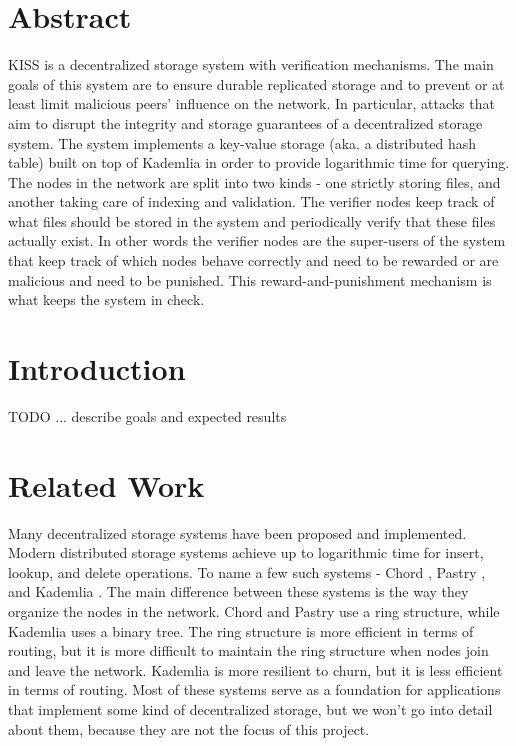 \documentclass[ twoside,openright,titlepage,numbers=noenddot,headinclude,%
                footinclude=true,cleardoublepage=empty,abstractoff, %
                BCOR=5mm,paper=a4,fontsize=11pt,%
                ngerman,american,%
                ]{scrreprt}
\begin{document}
\raggedbottom
{} %
\pagestyle{plain}

\begingroup

\chapter*{Abstract}
KISS is a decentralized storage system with verification mechanisms.
The main goals of this system are to ensure durable replicated storage and to prevent or at least limit malicious peers' influence on the network.
In particular, attacks that aim to disrupt the integrity and storage guarantees of a decentralized storage system.
The system implements a key-value storage (aka. a distributed hash table) built on top of Kademlia in order
to provide logarithmic time for querying.
The nodes in the network are split into two kinds - one strictly storing files, and another taking care of indexing and validation.
The verifier nodes keep track of what files should be stored in the system and periodically verify that these files actually exist.
In other words the verifier nodes are the super-users of the system that keep track of which nodes behave correctly
and need to be rewarded or are malicious and need to be punished.
This reward-and-punishment mechanism is what keeps the system in check.
\vfill
\endgroup			

\chapter{Introduction}

TODO ... describe goals and expected results 

\chapter{Related Work}

Many decentralized storage systems have been proposed and implemented.
Modern distributed storage systems achieve up to logarithmic time for insert, lookup, and delete operations.
To name a few such systems - Chord \cite{chord}, Pastry \cite{pastry}, and Kademlia \cite{kademlia}.
The main difference between these systems is the way they organize the nodes in the network.
Chord and Pastry use a ring structure, while Kademlia uses a binary tree.
The ring structure is more efficient in terms of routing, but it is more difficult to maintain the ring structure
when nodes join and leave the network.
Kademlia is more resilient to churn, but it is less efficient in terms of routing.
Most of these systems serve as a foundation for applications that implement some kind of decentralized storage,
but we won't go into detail about them, because they are not the focus of this project.
\end{document}
